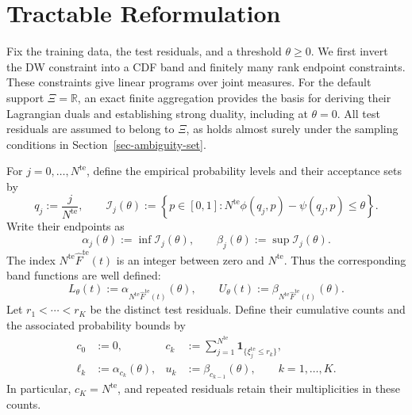 \section{Tractable Reformulation}
\label{sec-reformulation}

Fix the training data, the test residuals, and a threshold $\theta\ge0$. We first invert the DW constraint into a CDF band and finitely many rank endpoint constraints. These constraints give linear programs over joint measures. For the default support $\Xi=\mathbb R$, an exact finite aggregation provides the basis for deriving their Lagrangian duals and establishing strong duality, including at $\theta=0$. All test residuals are assumed to belong to $\Xi$, as holds almost surely under the sampling conditions in Section~\ref{sec-ambiguity-set}.

For $j=0,\ldots,N^{\mathrm{te}}$, define the empirical probability levels and their acceptance sets by
\begin{equation}
  q_j:=\frac{j}{N^{\mathrm{te}}},\qquad
  \mathcal I_j(\theta):=
  \left\{p\in[0,1]:
  N^{\mathrm{te}}\phi\left(q_j,p\right)-\psi\left(q_j,p\right)\le\theta\right\}.
  \label{eq-dw-rank-acceptance}
\end{equation}
Write their endpoints as
\begin{equation}
  \alpha_j(\theta):=\inf\mathcal I_j(\theta),\qquad
  \beta_j(\theta):=\sup\mathcal I_j(\theta).
  \label{eq-dw-rank-endpoints}
\end{equation}
The index $N^{\mathrm{te}}\widehat F^{\mathrm{te}}(t)$ is an integer between zero and $N^{\mathrm{te}}$. Thus the corresponding band functions are well defined:
\begin{equation}
  L_\theta(t):=\alpha_{N^{\mathrm{te}}\widehat F^{\mathrm{te}}(t)}(\theta),\qquad
  U_\theta(t):=\beta_{N^{\mathrm{te}}\widehat F^{\mathrm{te}}(t)}(\theta).
  \label{eq-dw-band-functions}
\end{equation}
Let $r_1<\cdots<r_K$ be the distinct test residuals. Define their cumulative counts and the associated probability bounds by
\begin{equation}
  \begin{aligned}
    c_0&:=0,&
    c_k&:=\sum_{j=1}^{N^{\mathrm{te}}}\mathbf1_{\{\xi_j^{\mathrm{te}}\le r_k\}},\\
    \ell_k&:=\alpha_{c_k}(\theta),&
    u_k&:=\beta_{c_{k-1}}(\theta),\qquad k=1,\ldots,K.
  \end{aligned}
  \label{eq-dw-counts-and-levels}
\end{equation}
In particular, $c_K=N^{\mathrm{te}}$, and repeated residuals retain their multiplicities in these counts.

